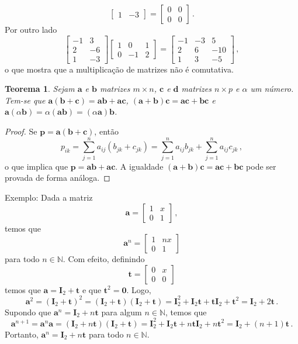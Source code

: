 \documentclass[12pt,a4paper]{report}
\newcommand{\mb}{\mathbf}
\newcommand{\N}{\mathbb{N}}
\newtheorem{thm}{Teorema}[chapter]
\begin{document}
\begin{enumerate}
$$\begin{bmatrix}
    1&-3
  \end{bmatrix}=\begin{bmatrix}
    0&0\\
    0&0
  \end{bmatrix}\,.$$
  Por outro lado
  $$\begin{bmatrix}
    -1&3\\
    2&-6\\
    1&-3
  \end{bmatrix}\begin{bmatrix}
    1&0&1\\
    0&-1&2
  \end{bmatrix}=\begin{bmatrix}
    -1&-3&5\\
    2&6&-10\\
    1&3&-5
  \end{bmatrix}\,,$$
  o que mostra que a multiplicação de matrizes não é comutativa.
\end{enumerate}

\begin{thm}
  Sejam $\mb a$ e $\mb b$ matrizes $m\times n$, $\mb c$ e $\mb d$ matrizes $n\times p$ e $\alpha$ um número. Tem-se que $\mb a(\mb b+\mb c)=\mb {ab}+\mb{ac}$, $(\mb a+\mb b)\mb c=\mb {ac}+\mb{bc}$ e $\mb a(\alpha\mb b)=\alpha (\mb {ab})=(\alpha \mb a)\mb b$.
\end{thm}
\begin{proof}
  Se $\mb p=\mb a(\mb b+\mb c)$, então
  $$p_{ik}=\sum_{j=1}^na_{ij}(b_{jk}+c_{jk})=\sum_{j=1}^na_{ij}b_{jk}+\sum_{j=1}^na_{ij}c_{jk}\,,$$
  o que implica que $\mb p=\mb {ab}+\mb{ac}$. A igualdade $(\mb a+\mb b)\mb c=\mb {ac}+\mb{bc}$ pode ser provada de forma análoga.
\end{proof}

Exemplo: Dada a matriz
$$\mb a=\begin{bmatrix}
  1&x\\
  0&1
\end{bmatrix}\,,$$
temos que
$$\mb a^n=\begin{bmatrix}
  1&nx\\
  0&1
\end{bmatrix}$$
para todo $n\in\N$. Com efeito, definindo
$$\mb t=\begin{bmatrix}
  0&x\\
  0&0
\end{bmatrix}$$
temos que $\mb a=\mb I_2+\mb t$ e que $\mb t^2=\mb 0$. Logo,
$$\mb a^2=(\mb I_2+\mb t)^2=(\mb I_2+\mb t)(\mb I_2+\mb t)=\mb I_2^2+\mb I_2\mb t+\mb t\mb I_2+\mb t^2=\mb I_2+2\mb t\,.$$
Supondo que $\mb a^n=\mb I_2+n\mb t$ para algum $n\in\N$, temos que
$$\mb a^{n+1}=\mb a^n\mb a=(\mb I_2+n\mb t)(\mb I_2+\mb t)=\mb I_2^2+\mb I_2\mb t+n\mb t\mb I_2+n\mb t^2=\mb I_2+(n+1)\mb t\,.$$
Portanto, $\mb a^n=\mb I_2+n\mb t$ para todo $n\in\N$.
\end{document}
